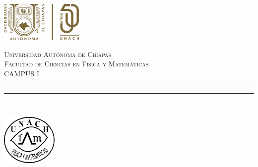 \begin{titlepage}
\hspace{-1.9cm}
\begin{minipage}[t][0.03\textheight][c]{0.22\textwidth}
    \includegraphics[width=4.0cm]{Logo50.png}
\end{minipage}\hspace{1.3cm}
\begin{minipage}[t][0.03\textheight][c]{0.8\textwidth}
	\vspace{1.8cm}
    \begin{center}
        \textsc{\Large Universidad Autónoma de Chiapas}\\[0.3cm]
        \textsc{\Large Facultad de Ciencias en Física y Matemáticas}\\[0.3cm]
        \textsc{\large CAMPUS I}
        \vspace{0.3cm}
        \hrule height 2.5pt
        \vspace{0.3cm}
        \hrule height 1pt
    \end{center}
\end{minipage}\\ %
\begin{minipage}[t][0.79\textheight][c]{0.06\textwidth}
    \vspace{40pt}
    \begin{center}
        \vrule width1pt height10cm %
        \vspace{5mm}
        \vrule width2.5pt height10cm
        \vspace{5mm}
        \vrule width1pt height10cm
   \end{center}\vspace{0.1cm} 
   \hspace{-1.4cm}
   \begin{minipage}[b][0.08\textheight][b]{0.2\textwidth}
        \includegraphics[width=2.7cm]{logofcfm.png}

\end{minipage}
\end{minipage}
\end{titlepage}
